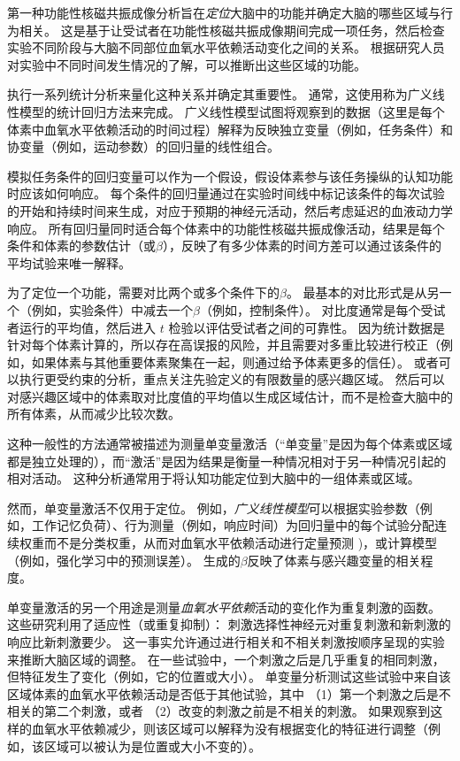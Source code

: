 第一种功能性核磁共振成像分析旨在\textit{定位}大脑中的功能并确定大脑的哪些区域与行为相关。
这是基于让受试者在功能性核磁共振成像期间完成一项任务，然后检查实验不同阶段与大脑不同部位血氧水平依赖活动变化之间的关系。
根据研究人员对实验中不同时间发生情况的了解，可以推断出这些区域的功能。


执行一系列统计分析来量化这种关系并确定其重要性。 
通常，这使用称为广义线性模型的统计回归方法来完成。
广义线性模型试图将观察到的数据（这里是每个体素中血氧水平依赖活动的时间过程）解释为反映独立变量（例如，任务条件）和协变量（例如，运动参数）的回归量的线性组合。


模拟任务条件的回归变量可以作为一个假设，假设体素参与该任务操纵的认知功能时应该如何响应。
每个条件的回归量通过在实验时间线中标记该条件的每次试验的开始和持续时间来生成，对应于预期的神经元活动，然后考虑延迟的血液动力学响应。
所有回归量同时适合每个体素中的功能性核磁共振成像活动，结果是每个条件和体素的参数估计（或$\beta$），反映了有多少体素的时间方差可以通过该条件的平均试验来唯一解释。


为了定位一个功能，需要对比两个或多个条件下的$\beta$。
最基本的对比形式是从另一个（例如，实验条件）中减去一个$\beta$（例如，控制条件）。 
对比度通常是每个受试者运行的平均值，然后进入 $t$ 检验以评估受试者之间的可靠性。 
因为统计数据是针对每个体素计算的，所以存在高误报的风险，并且需要对多重比较进行校正（例如，如果体素与其他重要体素聚集在一起，则通过给予体素更多的信任）。
或者可以执行更受约束的分析，重点关注先验定义的有限数量的感兴趣区域。
然后可以对感兴趣区域中的体素取对比度值的平均值以生成区域估计，而不是检查大脑中的所有体素，从而减少比较次数。


这种一般性的方法通常被描述为测量单变量激活（“单变量”是因为每个体素或区域都是独立处理的），而“激活”是因为结果是衡量一种情况相对于另一种情况引起的相对活动。
这种分析通常用于将认知功能定位到大脑中的一组体素或区域。


然而，单变量激活不仅用于定位。
例如，\textit{广义线性模型}可以根据实验参数（例如，工作记忆负荷）、行为测量（例如，响应时间）为回归量中的每个试验分配连续权重而不是分类权重，从而对血氧水平依赖活动进行定量预测 )，或计算模型（例如，强化学习中的预测误差）。
生成的$\beta$反映了体素与感兴趣变量的相关程度。


单变量激活的另一个用途是测量\textit{血氧水平依赖}活动的变化作为重复刺激的函数。
这些研究利用了适应性（或重复抑制）：
刺激选择性神经元对重复刺激和新刺激的响应比新刺激要少。
这一事实允许通过进行相关和不相关刺激按顺序呈现的实验来推断大脑区域的调整。
在一些试验中，一个刺激之后是几乎重复的相同刺激，但特征发生了变化（例如，它的位置或大小）。
单变量分析测试这些试验中来自该区域体素的血氧水平依赖活动是否低于其他试验，其中
（1）第一个刺激之后是不相关的第二个刺激，或者
（2）改变的刺激之前是不相关的刺激。
如果观察到这样的血氧水平依赖减少，则该区域可以解释为没有根据变化的特征进行调整（例如，该区域可以被认为是位置或大小不变的）。


